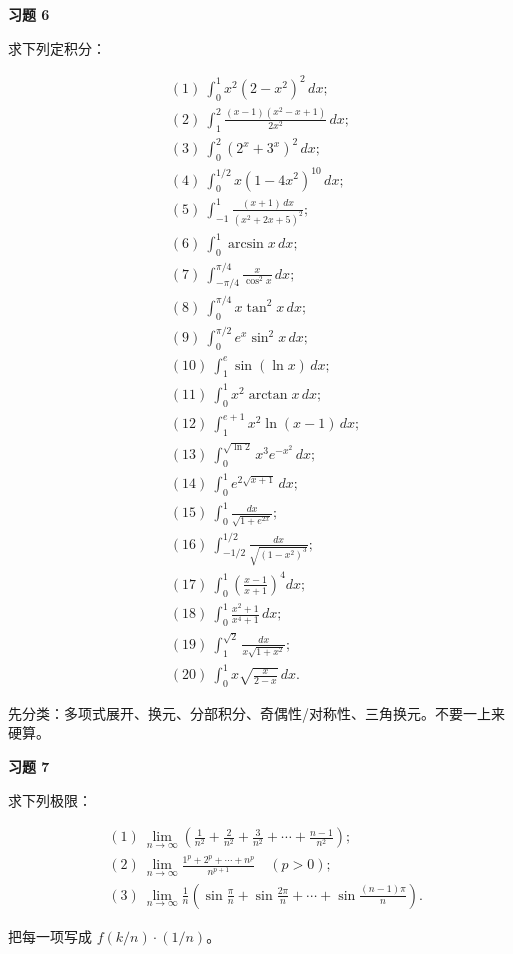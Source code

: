 \begin{exercisebox}
\textbf{习题 6 }

求下列定积分：

\[
      \begin{aligned}
      &(1)\ \int_0^1 x^2(2-x^2)^2\,dx;\\
      &(2)\ \int_1^2\frac{(x-1)(x^2-x+1)}{2x^2}\,dx;\\
      &(3)\ \int_0^2(2^x+3^x)^2\,dx;\\
      &(4)\ \int_0^{1/2}x(1-4x^2)^{10}\,dx;\\
      &(5)\ \int_{-1}^{1}\frac{(x+1)\,dx}{(x^2+2x+5)^2};\\
      &(6)\ \int_0^1\arcsin x\,dx;\\
      &(7)\ \int_{-\pi/4}^{\pi/4}\frac{x}{\cos^2x}\,dx;\\
      &(8)\ \int_0^{\pi/4}x\tan^2x\,dx;\\
      &(9)\ \int_0^{\pi/2}e^x\sin^2x\,dx;\\
      &(10)\ \int_1^e\sin(\ln x)\,dx;\\
      &(11)\ \int_0^1 x^2\arctan x\,dx;\\
      &(12)\ \int_1^{e+1}x^2\ln(x-1)\,dx;\\
      &(13)\ \int_0^{\sqrt{\ln2}}x^3e^{-x^2}\,dx;\\
      &(14)\ \int_0^1 e^{2\sqrt{x+1}}\,dx;\\
      &(15)\ \int_0^1\frac{dx}{\sqrt{1+e^{2x}}};\\
      &(16)\ \int_{-1/2}^{1/2}\frac{dx}{\sqrt{(1-x^2)^3}};\\
      &(17)\ \int_0^1\left(\frac{x-1}{x+1}\right)^4dx;\\
      &(18)\ \int_0^1\frac{x^2+1}{x^4+1}\,dx;\\
      &(19)\ \int_1^{\sqrt2}\frac{dx}{x\sqrt{1+x^2}};\\
      &(20)\ \int_0^1x\sqrt{\frac{x}{2-x}}\,dx.
      \end{aligned}
      \]

\begin{hintbox}
先分类：多项式展开、换元、分部积分、奇偶性/对称性、三角换元。不要一上来硬算。
\end{hintbox}
\end{exercisebox}

\begin{exercisebox}
\textbf{习题 7 }

求下列极限：

\[
      \begin{aligned}
      &(1)\ \lim_{n\to\infty}\left(\frac1{n^2}+\frac2{n^2}+\frac3{n^2}+\cdots+\frac{n-1}{n^2}\right);\\
      &(2)\ \lim_{n\to\infty}\frac{1^p+2^p+\cdots+n^p}{n^{p+1}}\quad(p>0);\\
      &(3)\ \lim_{n\to\infty}\frac1n\left(\sin\frac{\pi}{n}+\sin\frac{2\pi}{n}+\cdots+\sin\frac{(n-1)\pi}{n}\right).
      \end{aligned}
      \]

\begin{hintbox}
把每一项写成 \(f(k/n)\cdot(1/n)\)。
\end{hintbox}
\end{exercisebox}


